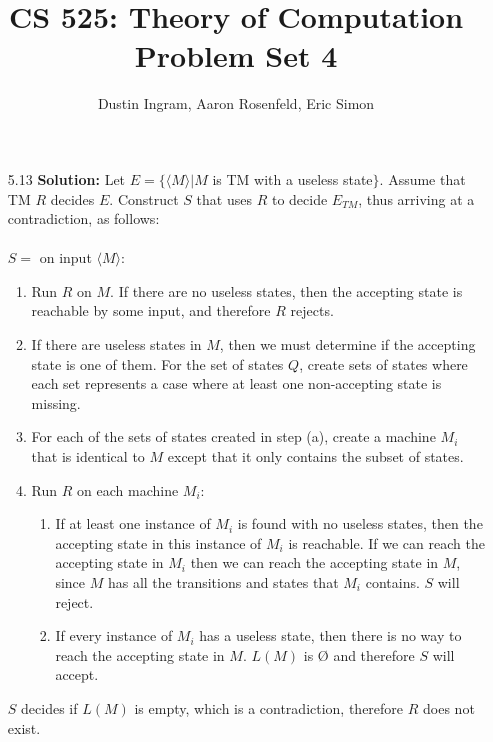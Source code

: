 \documentclass{article}
\title{CS 525: Theory of Computation\\ Problem Set 4}
\author{Dustin Ingram, Aaron Rosenfeld, Eric Simon}
\begin{document}
\maketitle
\begin{enumerate}
    \item[5.13] \textbf{Solution:}
    Let $E = \{\langle M \rangle | M $ is TM with a useless state$\}$. Assume that TM $R$ decides $E$. Construct $S$ that uses $R$ to decide $E_{TM}$, thus arriving at a contradiction, as follows: \\ \\ 
    $S = $ on input $\langle M\rangle$:
    \begin{enumerate}
        \item Run $R$ on $M$. If there are no useless states, then the accepting state is reachable by some input, and therefore $R$ rejects.
        \item If there are useless states in $M$, then we must determine if the accepting state is one of them. For the set of states $Q$, create sets of states where each set represents a case where at least one non-accepting state is missing. 
        \item For each of the sets of states created in step (a), create a machine $M_{i}$ that is identical to $M$ except that it only contains the subset of states.
        \item Run $R$ on each machine $M_{i}$: 

        \begin{enumerate}
            \item If at least one instance of $M_{i}$ is found with no useless states, then the accepting state in this instance of $M_{i}$ is reachable. If we can reach the accepting state in $M_{i}$ then we can reach the accepting state in $M$, since $M$ has all the transitions and states that $M_{i}$ contains. $S$ will reject. 
            \item If every instance of $M_{i}$ has a useless state, then there is no way to reach the accepting state in $M$. $L(M)$ is $\textrm{Ø}$ and therefore $S$ will accept.
        \end{enumerate}
    \end{enumerate}
    $S$ decides if $L(M)$ is empty, which is a contradiction, therefore $R$ does not exist.


\end{enumerate}
\end{document}
